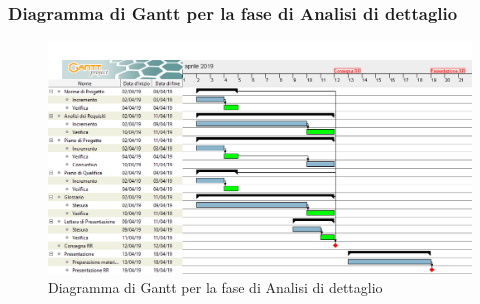 \subsubsection{Diagramma di Gantt per la fase di Analisi di dettaglio}
\begin{figure}[h!]
\begin{center}
  \includegraphics[scale=0.31]{immagini/AnalisiDettaglioGantt.png}
  \caption{Diagramma di Gantt per la fase di Analisi di dettaglio}
  \end{center}
\end{figure}

\newpage 

